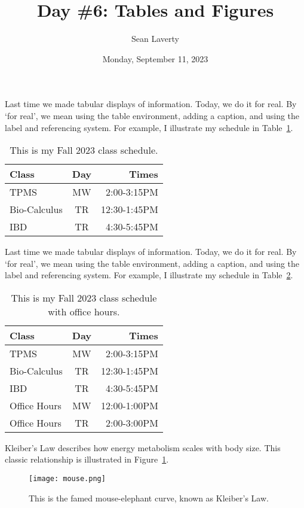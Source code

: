 \documentclass[12pt]{article}
\author{Sean Laverty}
\title{Day \#6: Tables and Figures}
\date{Monday, September 11, 2023}
\begin{document}
\titlepage
\newpage

\listoftables
\listoffigures
\newpage


Last time we made tabular displays of information.  Today, we do it for real.  By `for real', we mean using the table environment, adding a caption, and using the label and referencing system. For example, I illustrate my schedule in Table~\ref{tab::schedule}.

\begin{table}[h] %
\caption{This is my Fall 2023 class schedule.}\label{tab::schedule}
\centering
\begin{tabular}{lcr} %
Class & Day & Times\\
\hline\hline
TPMS & MW & 2:00-3:15PM\\
Bio-Calculus & TR & 12:30-1:45PM\\
IBD & TR & 4:30-5:45PM
\end{tabular}
\end{table}

Last time we made tabular displays of information.  Today, we do it for real.  By `for real', we mean using the table environment, adding a caption, and using the label and referencing system. For example, I illustrate my schedule in Table~\ref{tab::schedule_office}.

\begin{table}[h] %
\caption{This is my Fall 2023 class schedule with office hours.}\label{tab::schedule_office}
\centering
\begin{tabular}{lcr} %
Class & Day & Times\\
\hline\hline
TPMS & MW & 2:00-3:15PM\\
Bio-Calculus & TR & 12:30-1:45PM\\
IBD & TR & 4:30-5:45PM\\
\hline
Office Hours & MW & 12:00-1:00PM\\
Office Hours & TR & 2:00-3:00PM
\end{tabular}
\end{table}

\newpage

Kleiber's Law describes how energy metabolism scales with body size. This classic relationship is illustrated in Figure~\ref{fig::mouse}.

\begin{figure}[h!]%
\centering
\texttt{[image: mouse.png]}
\caption{This is the famed mouse-elephant curve, known as Kleiber's Law.}\label{fig::mouse}
\end{figure}
\end{document}
